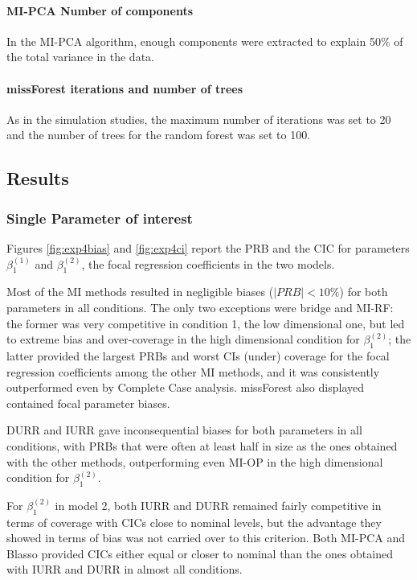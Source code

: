 	\paragraph{MI-PCA Number of components}

	In the MI-PCA algorithm, enough components were extracted to explain 50\% of the total variance in the data.

	\paragraph{missForest iterations and number of trees}

	As in the simulation studies, the maximum number of iterations was set to 20 and the number of trees
	for the random forest was set to 100.

\subsection{Results}

	\subsubsection{Single Parameter of interest}

	Figures \ref{fig:exp4bias} and \ref{fig:exp4ci} report the PRB and the CIC for parameters $\beta^{(1)}_{1}$ and 
	$\beta^{(2)}_{1}$, the focal regression coefficients in the two models.

	Most of the MI methods resulted in negligible biases ($|PRB| < 10\%$) for both parameters in all conditions.
	The only two exceptions were bridge and MI-RF: 
	the former was very competitive in condition 1, the low dimensional one, but led to extreme bias and 
	over-coverage in the high dimensional condition for $\beta^{(2)}_{1}$; 
	the latter provided the largest PRBs and worst CIs (under) coverage for the focal regression coefficients among 
	the other MI methods, and it was consistently outperformed even by Complete Case analysis.
	missForest also displayed contained focal parameter biases.

	DURR and IURR gave inconsequential biases for both parameters in all conditions, with PRBs that were
	often at least half in size as the ones obtained with the other methods, outperforming even MI-OP in the high 
	dimensional condition for $\beta^{(2)}_{1}$.

	For $\beta^{(2)}_{1}$ in model 2, both IURR and DURR remained fairly competitive in terms of coverage 
	with CICs close to nominal levels, but the advantage they showed in terms of bias was not carried over to 
	this criterion.
	Both MI-PCA and Blasso provided CICs either equal or closer to nominal than the ones obtained with
	IURR and DURR in almost all conditions.


